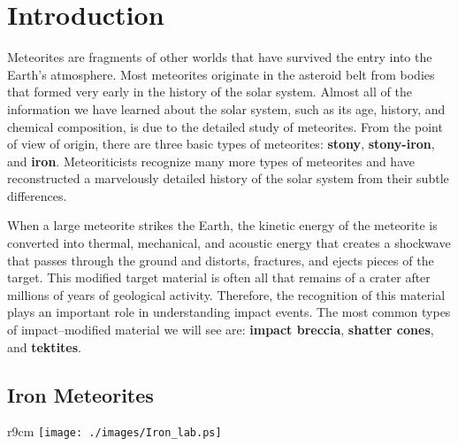 %

\setlength{\parindent}{0em}
\setlength{\baselineskip}{15pt}
\setlength{\parskip}{0.6ex}
\setcounter{page}{1}


\vfill

\section*{Introduction}

Meteorites are fragments of other worlds that have survived the entry
into the Earth's atmosphere.  Most meteorites originate in the
asteroid belt from bodies that formed very early in the history of the
solar system.  Almost all of the information we have learned about the
solar system, such as its age, history, and chemical composition, is
due to the detailed study of meteorites.  From the point of view of
origin, there are three basic types of meteorites: {\bf stony}, {\bf
  stony-iron}, and {\bf iron}.  Meteoriticists recognize many more
types of meteorites and have reconstructed a marvelously detailed
history of the solar system from their subtle differences.

When a large meteorite strikes the Earth, the kinetic energy of the
meteorite is converted into thermal, mechanical, and acoustic energy
that creates a shockwave that passes through the ground and distorts,
fractures, and ejects pieces of the target.  This modified target
material is often all that remains of a crater after millions of years
of geological activity.  Therefore, the recognition of this material
plays an important role in understanding impact events.  The most
common types of impact--modified material we will see are: {\bf impact
  breccia}, {\bf shatter cones}, and {\bf tektites}.


\vfill

\subsection*{Iron Meteorites}

\begin{wrapfigure}{r}{9cm}
\texttt{[image: ./images/Iron\_lab.ps]}
\end{wrapfigure}

